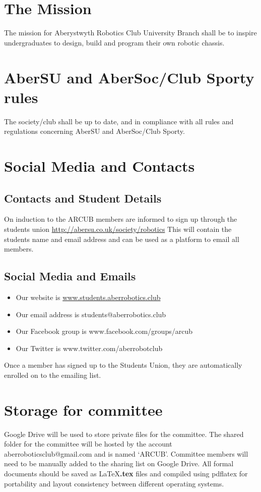 \documentclass[a4paper,11pt]{article}
\begin{document}
\section{The Mission}
The mission for Aberystwyth Robotics Club University Branch shall be to inspire undergraduates to design, build and program their own robotic chassis.

\section{AberSU and AberSoc/Club Sporty rules}
The society/club shall be up to date, and in compliance with all rules and regulations concerning AberSU and AberSoc/Club Sporty.

\section{Social Media and Contacts}
\subsection{Contacts and Student Details}
On induction to the ARCUB members are informed to sign up through the students union \url{http://abersu.co.uk/society/robotics}\newline
This will contain the students name and email address and can be used as a platform to email all members.

\subsection{Social Media and Emails}
\begin{itemize}[nolistsep]
  \item Our website is \url{www.students.aberrobotics.club}
  \item Our email address is students@aberrobotics.club
  \item Our Facebook group is www.facebook.com/groups/arcub
  \item Our Twitter is www.twitter.com/aberrobotclub
\end{itemize}
Once a member has signed up to the Students Union, they are automatically enrolled on to the emailing list.

\section{Storage for committee}
Google Drive will be used to store private files for the committee. The shared folder for the committee will be hosted by the account aberroboticsclub@gmail.com and is named ‘ARCUB’.\newline
Committee members will need to be manually added to the sharing list on Google Drive.\newline
All formal documents should be saved as \LaTeX \textbf{.tex} files and compiled using pdflatex for portability and layout consistency between different operating systems.
\end{document}
